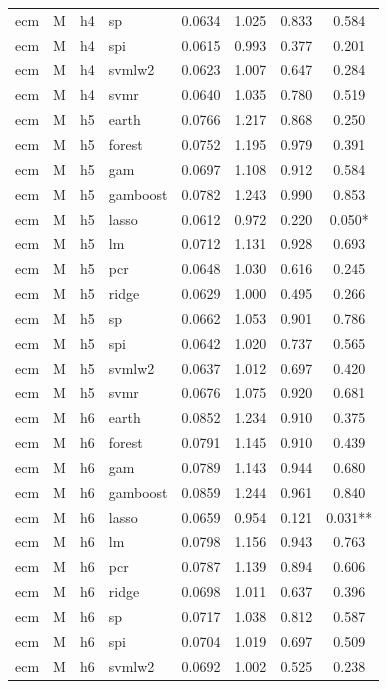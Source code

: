 \begin{ThreePartTable}
\begin{longtable}[t]{llclcccc}
ecm & M & h4 & sp & 0.0634 & 1.025 & 0.833 & 0.584\\
ecm & M & h4 & spi & 0.0615 & 0.993 & 0.377 & 0.201\\
ecm & M & h4 & svmlw2 & 0.0623 & 1.007 & 0.647 & 0.284\\
ecm & M & h4 & svmr & 0.0640 & 1.035 & 0.780 & 0.519\\
\addlinespace
ecm & M & h5 & earth & 0.0766 & 1.217 & 0.868 & 0.250\\
ecm & M & h5 & forest & 0.0752 & 1.195 & 0.979 & 0.391\\
ecm & M & h5 & gam & 0.0697 & 1.108 & 0.912 & 0.584\\
ecm & M & h5 & gamboost & 0.0782 & 1.243 & 0.990 & 0.853\\
ecm & M & h5 & lasso & 0.0612 & 0.972 & 0.220 & 0.050*\\
ecm & M & h5 & lm & 0.0712 & 1.131 & 0.928 & 0.693\\
ecm & M & h5 & pcr & 0.0648 & 1.030 & 0.616 & 0.245\\
ecm & M & h5 & ridge & 0.0629 & 1.000 & 0.495 & 0.266\\
ecm & M & h5 & sp & 0.0662 & 1.053 & 0.901 & 0.786\\
ecm & M & h5 & spi & 0.0642 & 1.020 & 0.737 & 0.565\\
ecm & M & h5 & svmlw2 & 0.0637 & 1.012 & 0.697 & 0.420\\
ecm & M & h5 & svmr & 0.0676 & 1.075 & 0.920 & 0.681\\
\addlinespace
ecm & M & h6 & earth & 0.0852 & 1.234 & 0.910 & 0.375\\
ecm & M & h6 & forest & 0.0791 & 1.145 & 0.910 & 0.439\\
ecm & M & h6 & gam & 0.0789 & 1.143 & 0.944 & 0.680\\
ecm & M & h6 & gamboost & 0.0859 & 1.244 & 0.961 & 0.840\\
ecm & M & h6 & lasso & 0.0659 & 0.954 & 0.121 & 0.031**\\
ecm & M & h6 & lm & 0.0798 & 1.156 & 0.943 & 0.763\\
ecm & M & h6 & pcr & 0.0787 & 1.139 & 0.894 & 0.606\\
ecm & M & h6 & ridge & 0.0698 & 1.011 & 0.637 & 0.396\\
ecm & M & h6 & sp & 0.0717 & 1.038 & 0.812 & 0.587\\
ecm & M & h6 & spi & 0.0704 & 1.019 & 0.697 & 0.509\\
ecm & M & h6 & svmlw2 & 0.0692 & 1.002 & 0.525 & 0.238\\

\end{longtable}
\end{ThreePartTable}
